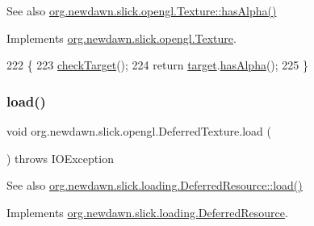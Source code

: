 \begin{DoxySeeAlso}{See also}
\mbox{\hyperlink{interfaceorg_1_1newdawn_1_1slick_1_1opengl_1_1_texture_a230a2e79b666be14738b585028fbe004}{org.\+newdawn.\+slick.\+opengl.\+Texture\+::has\+Alpha()}} 
\end{DoxySeeAlso}


Implements \mbox{\hyperlink{interfaceorg_1_1newdawn_1_1slick_1_1opengl_1_1_texture_a230a2e79b666be14738b585028fbe004}{org.\+newdawn.\+slick.\+opengl.\+Texture}}.


\begin{DoxyCode}
222                               \{
223         \mbox{\hyperlink{classorg_1_1newdawn_1_1slick_1_1opengl_1_1_deferred_texture_a22f14bcd9cbd4bf033e2308b90464dce}{checkTarget}}();
224         \textcolor{keywordflow}{return} \mbox{\hyperlink{classorg_1_1newdawn_1_1slick_1_1opengl_1_1_deferred_texture_aa70a4b195d0b965a0099d0e7bc18d9d2}{target}}.\mbox{\hyperlink{classorg_1_1newdawn_1_1slick_1_1opengl_1_1_texture_impl_ae07673bff3b44a0f681a8ec9a9a5fadf}{hasAlpha}}();
225     \}
\end{DoxyCode}
\mbox{\label{classorg_1_1newdawn_1_1slick_1_1opengl_1_1_deferred_texture_adaa55791770295ee94c057781634b50a}} 
\subsubsection{\texorpdfstring{load()}{load()}}
{\footnotesize\ttfamily void org.\+newdawn.\+slick.\+opengl.\+Deferred\+Texture.\+load (\begin{DoxyParamCaption}{ }\end{DoxyParamCaption}) throws I\+O\+Exception\hspace{0.3cm}{\ttfamily [inline]}}

\begin{DoxySeeAlso}{See also}
\mbox{\hyperlink{interfaceorg_1_1newdawn_1_1slick_1_1loading_1_1_deferred_resource_a08c6171e3a44634c06c9160f5b785ad6}{org.\+newdawn.\+slick.\+loading.\+Deferred\+Resource\+::load()}} 
\end{DoxySeeAlso}


Implements \mbox{\hyperlink{interfaceorg_1_1newdawn_1_1slick_1_1loading_1_1_deferred_resource_a08c6171e3a44634c06c9160f5b785ad6}{org.\+newdawn.\+slick.\+loading.\+Deferred\+Resource}}.


